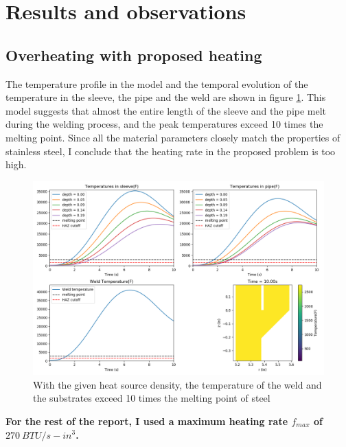 \documentclass{article}
\begin{document}
\section{Results and observations}

\subsection{Overheating with proposed heating}

	The temperature profile in the model and the temporal evolution of the temperature in the sleeve, the pipe and the weld are shown in figure \ref{fig2}. This model suggests that almost the entire length of the sleeve and the pipe melt during the welding process, and the peak temperatures exceed 10 times the melting point. Since all the material parameters closely match the properties of stainless steel, I conclude that the heating rate in the proposed problem is too high.\\ 

\begin{figure}[h]
\centering
\includegraphics[width=12cm]{old_model.png}
\caption{With the given heat source density, the temperature of the weld and the substrates exceed 10 times the melting point of steel}
\label{fig2}
\end{figure}

\textbf{For the rest of the report, I used a maximum heating rate $f_{max}$ of $270~ BTU/s-in^3$.}
\end{document}
